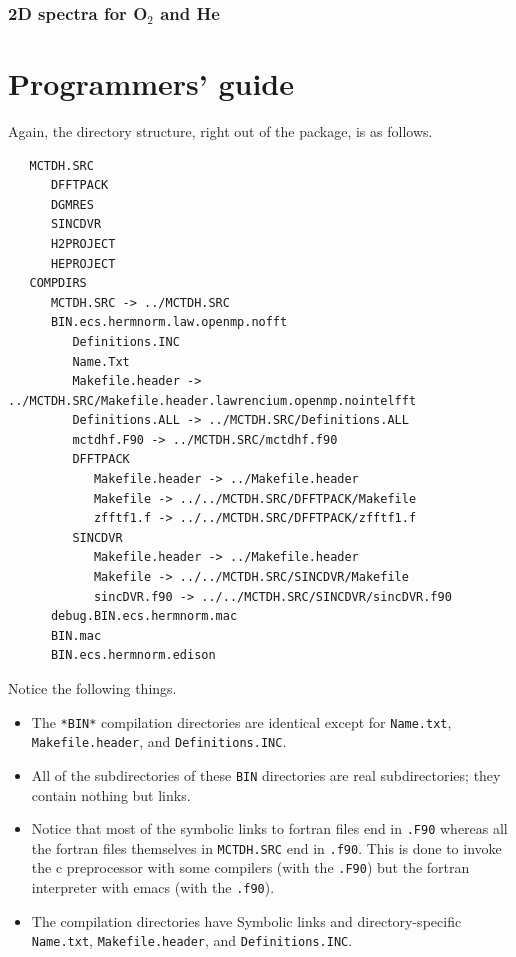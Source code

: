 \documentclass[10pt,leqno, oneside]{book}
\begin{document}
\subsection{2D spectra for O$_2$ and He}



\chapter{Programmers' guide}


Again, the directory structure, right out of the package, is as follows. 

{\footnotesize
\begin{verbatim}
   MCTDH.SRC
      DFFTPACK
      DGMRES
      SINCDVR
      H2PROJECT
      HEPROJECT
   COMPDIRS
      MCTDH.SRC -> ../MCTDH.SRC
      BIN.ecs.hermnorm.law.openmp.nofft
         Definitions.INC
         Name.Txt
         Makefile.header -> ../MCTDH.SRC/Makefile.header.lawrencium.openmp.nointelfft
         Definitions.ALL -> ../MCTDH.SRC/Definitions.ALL
         mctdhf.F90 -> ../MCTDH.SRC/mctdhf.f90
         DFFTPACK
            Makefile.header -> ../Makefile.header
            Makefile -> ../../MCTDH.SRC/DFFTPACK/Makefile
            zfftf1.f -> ../../MCTDH.SRC/DFFTPACK/zfftf1.f
         SINCDVR
            Makefile.header -> ../Makefile.header
            Makefile -> ../../MCTDH.SRC/SINCDVR/Makefile
            sincDVR.f90 -> ../../MCTDH.SRC/SINCDVR/sincDVR.f90
      debug.BIN.ecs.hermnorm.mac
      BIN.mac
      BIN.ecs.hermnorm.edison
\end{verbatim}}

Notice the following things.
\begin{itemize}
\item{The \verb#*BIN*# compilation directories are identical 
except for \verb#Name.txt#, \verb#Makefile.header#, and \verb#Definitions.INC#.}
\item{All of the subdirectories of these \verb#BIN# directories are real subdirectories; they contain nothing but links.}
\item{Notice that most of the symbolic links to fortran files end in \verb#.F90# whereas all the fortran files themselves
in \verb#MCTDH.SRC# end in \verb#.f90#.  This is done to invoke the c preprocessor with some compilers (with the
\verb#.F90#) but the fortran interpreter with emacs (with the \verb#.f90#).}
\item{The compilation directories have
Symbolic links and directory-specific 
 \verb#Name.txt#, \verb#Makefile.header#, and \verb#Definitions.INC#.}
\end{itemize}
\end{document}
